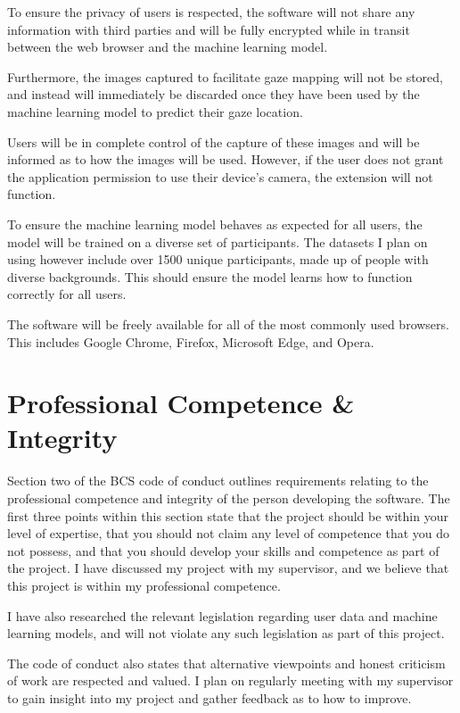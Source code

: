 \documentclass{report}
\begin{document}
To ensure the privacy of users is respected, the software will not share any information with third parties and will be fully encrypted while in transit between the web browser and the machine learning model. 

Furthermore, the images captured to facilitate gaze mapping will not be stored, and instead will immediately be discarded once they have been used by the machine learning model to predict their gaze location.

Users will be in complete control of the capture of these images and will be informed as to how the images will be used. However, if the user does not grant the application permission to use their device's camera, the extension will not function. 

To ensure the machine learning model behaves as expected for all users, the model will be trained on a diverse set of participants. The datasets I plan on using however include over 1500 unique participants, made up of people with diverse backgrounds. This should ensure the model learns how to function correctly for all users. 

The software will be freely available for all of the most commonly used browsers. This includes Google Chrome, Firefox, Microsoft Edge, and Opera. 

\section{Professional Competence \& Integrity}   

Section two of the BCS code of conduct outlines requirements relating to the professional competence and integrity of the person developing the software. The first three points within this section state that the project should be within your level of expertise, that you should not claim any level of competence that you do not possess, and that you should develop your skills and competence as part of the project. I have discussed my project with my supervisor, and we believe that this project is within my professional competence.

I have also researched the relevant legislation regarding user data and machine learning models, and will not violate any such legislation as part of this project. 

The code of conduct also states that alternative viewpoints and honest criticism of work are respected and valued. I plan on regularly meeting with my supervisor to gain insight into my project and gather feedback as to how to improve. 
\end{document}
